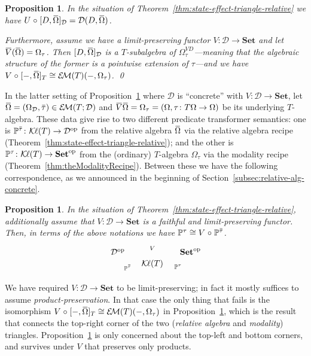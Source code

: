 \documentclass[9pt, preprint]{sigplanconf}
\theoremstyle{theorem}
\newtheorem{proposition}[theorem]{Proposition}
\theoremstyle{definition}
\newcommand{\cat}[1]{\mathcal{#1}}
\renewcommand{\bar}{\overbar}
\newcommand{\overbar}[1]{\mkern 1.5mu\overline{\mkern-1.5mu#1\mkern-1.5mu}\mkern 1.5mu}
\newcommand{\place}{{-}}
\newcommand{\op}{\mathrm{op}}
\newcommand{\Set}{\mathbf{Set}}
\newcommand{\Sets}{\Set}
\newcommand{\EM}{\mathcal{E}{\kern-.5ex}\mathcal{M}}
\newcommand{\Kl}{\mathcal{K}{\kern-.2ex}\ell}
\newcommand{\OmegaD}{\Omega_{\cat{D}}}
\newcommand{\after}{\mathrel{\circ}}
\newcommand{\co}{\mathrel{\circ}}
\newcommand{\bbP}{\mathbb{P}}
\begin{document}
\begin{proposition}
  \label{prop:state-pred-duality-forgetful}
  In the situation of Theorem~\ref{thm:state-effect-triangle-relative}
  we have $U \after [D, \bar{\Omega}]_{\cat{D}} = \cat{D}(D,
 \bar{\Omega})$.

  Furthermore, assume we have a limit-preserving functor $V \colon \cat{D} \to \Set$
  and let $\bar{V}(\bar{\Omega}) = \Omega_{\tau}$.
  Then $[D, \bar{\Omega}]_{\cat{D}}$ is a $T$-subalgebra of
 $\Omega_{\tau}^{VD}$---meaning that the algebraic structure of the
 former is a pointwise extension of $\tau$---and we have $V \co [\place,
 \bar{\Omega}]_{T} \cong \EM(T)(\place, \Omega_{\tau})$.
\qed
\end{proposition}
\noindent
In the latter setting of
Proposition~\ref{prop:state-pred-duality-forgetful} where
 $\cat{D}$ is ``concrete'' with $V\colon \cat{D}\to\Sets$, let
 $\bar{\Omega} = (\OmegaD, \bar{\tau}) \in \EM(T;\cat{D})$ and
 $\bar{V}\bar{\Omega} = \Omega_{\tau} = (\Omega, \tau \colon T{\Omega} \to \Omega)$
be its underlying $T$-algebra. These data give rise to
two different
 predicate transformer semantics:
 one is $\bbP^{\bar{\tau}} \colon \Kl(T) \to \cat{D}^{\op}$
from the relative algebra $\bar{\Omega}$ via the relative algebra recipe (Theorem~\ref{thm:state-effect-triangle-relative}); and
the other is $\bbP^{\tau} \colon \Kl(T) \to \cat{\Set}^{\op}$
from the (ordinary) $T$-algebra $\Omega_{\tau}$ via the modality recipe
(Theorem~\ref{thm:theModalityRecipe}). Between these we have the
following correspondence, as we announced in the beginning of
Section~\ref{subsec:relative-alg-concrete}.
\begin{proposition} \label{prop:01190015}
  In the situation of Theorem~\ref{thm:state-effect-triangle-relative},
 additionally assume that  $V\colon \cat{D}\to\Sets$ is a faithful and
 limit-preserving functor. Then, in terms of the above notations we have
  $\bbP^{\tau} \cong V \after \bbP^{\bar{\tau}}$.
  \begin{equation}\label{eq:state-effect-triagle-concrete}
  \vcenter{
   \xymatrix@R-2.5em@C-1em{
        \cat{D}^{\op} \ar[rr]^-{V}
        &&  \Set^{\op} \\
        & \Kl(T) \ar@/^/[ul]^-{\bbP^{\bar{\tau}}} \ar@/_/[ur]_-{\bbP^{\tau}}
      }
  }
  \end{equation}
\end{proposition}

 We have required $V\colon \cat{D}\to \Sets$ to be limit-preserving; in fact it mostly suffices
 to assume \emph{product-preservation}. In that case the only thing that
 fails is the isomorphism $V \co [\place,
 \bar{\Omega}]_{T} \cong \EM(T)(\place, \Omega_{\tau})$ in
 Proposition~\ref{prop:state-pred-duality-forgetful}, which is the result
 that connects the top-right corner of the two (\emph{relative algebra} and
 \emph{modality}) triangles. Proposition~\ref{prop:01190015} is
 only concerned about the top-left and bottom corners, and survives
 under $V$ that preserves only products.
\end{document}
